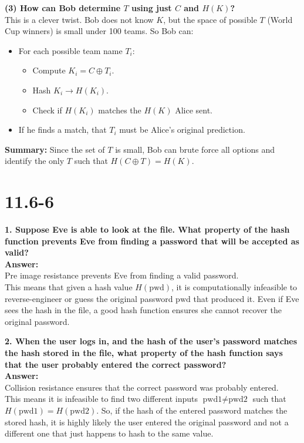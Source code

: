 \documentclass[12pt]{article}
\begin{document}
\textbf{(3) How can Bob determine \( T \) using just \( C \) and \( H(K) \)?} \\
This is a clever twist. Bob does not know \( K \), but the space of possible \( T \) (World Cup winners) is small under 100 teams. So Bob can:
\begin{itemize}
    \item For each possible team name \( T_i \):
    \begin{itemize}
        \item Compute \( K_i = C \oplus T_i \).
        \item Hash \( K_i \rightarrow H(K_i) \).
        \item Check if \( H(K_i) \) matches the \( H(K) \) Alice sent.
    \end{itemize}
    \item If he finds a match, that \( T_i \) must be Alice's original prediction.
\end{itemize}

\textbf{Summary:} Since the set of \( T \) is small, Bob can brute force all options and identify the only \( T \) such that \( H(C \oplus T) = H(K) \).
\newpage
\section*{11.6-6}
\textbf{1. Suppose Eve is able to look at the file. What property of the hash function prevents Eve from finding a password that will be accepted as valid?} \\
\textbf{Answer:} \\
Pre image resistance prevents Eve from finding a valid password. \\
This means that given a hash value \( H(\text{pwd}) \), it is computationally infeasible to reverse-engineer or guess the original password \( \text{pwd} \) that produced it. Even if Eve sees the hash in the file, a good hash function ensures she cannot recover the original password.

\textbf{2. When the user logs in, and the hash of the user's password matches the hash stored in the file, what property of the hash function says that the user probably entered the correct password?} \\
\textbf{Answer:} \\
Collision resistance ensures that the correct password was probably entered. \\
This means it is infeasible to find two different inputs \( \text{pwd1} \neq \text{pwd2} \) such that \( H(\text{pwd1}) = H(\text{pwd2}) \). So, if the hash of the entered password matches the stored hash, it is highly likely the user entered the original password and not a different one that just happens to hash to the same value.
\newpage
\end{document}
